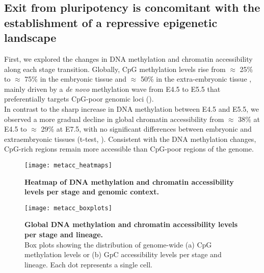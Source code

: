 \subsection{Exit from pluripotency is concomitant with the establishment of a repressive epigenetic landscape}

First, we explored the changes in DNA methylation and chromatin accessibility along each stage transition. Globally, CpG methylation levels rise from $\approx$ 25\% to $\approx$ 75\% in the embryonic tissue and $\approx$ 50\% in the extra-embryonic tissue , mainly driven by a \textit{de novo} methylation wave from E4.5 to E5.5 that preferentially targets CpG-poor genomic loci \cite{Auclair2014,Zhang2017} ().\\
In contrast to the sharp increase in DNA methylation between E4.5 and E5.5, we observed a more gradual decline in global chromatin accessibility from $\approx$ 38\% at E4.5 to $\approx$ 29\% at E7.5, with no significant differences between embryonic and extraembryonic tissues (t-test, ). Consistent with the DNA methylation changes, CpG-rich regions remain more accessible than CpG-poor regions of the genome.

\begin{figure}[H]
	\centering
	\texttt{[image: metacc\_heatmaps]}
	\caption[]{\textbf{Heatmap of DNA methylation and chromatin accessibility levels per stage and genomic context.}}
	\label{fig:metacc_heatmaps}
\end{figure}

\begin{figure}[H]
	\centering
	\texttt{[image: metacc\_boxplots]}
	\caption[]{
	\textbf{Global DNA methylation and chromatin accessibility levels per stage and lineage.} \\
	Box plots showing the distribution of genome-wide (a) CpG methylation levels or (b) GpC accessibility levels per stage and lineage. Each dot represents a single cell.
	}
	\label{fig:metacc_boxplots}
\end{figure}

